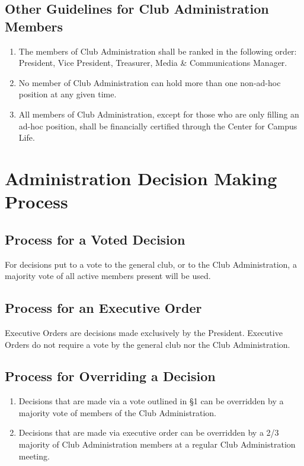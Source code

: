 \documentclass[english,11pt]{article}
\begin{document}
\subsection{Other Guidelines for Club Administration Members}

\begin{enumerate}[label=\Alph*.]
\item The members of Club Administration shall be ranked in the following order: President, Vice President, Treasurer, Media \& Communications Manager.
\item No member of Club Administration can hold more than one non-ad-hoc position at any given time.
\item All members of Club Administration, except for those who are only filling an ad-hoc position, shall be financially certified through the Center for Campus Life.
\end{enumerate}

\section{Administration Decision Making Process}

\subsection{Process for a Voted Decision}
For decisions put to a vote to the general club, or to the Club Administration, a majority vote of all active members present will be used.

\subsection{Process for an Executive Order}
Executive Orders are decisions made exclusively by the President.
Executive Orders do not require a vote by the general club nor the Club Administration.

\subsection{Process for Overriding a Decision}
\begin{enumerate}[label=\Alph*.]
\item Decisions that are made via a vote outlined in §1 can be overridden by a majority vote of members of the Club Administration.
\item Decisions that are made via executive order can be overridden by a 2/3 majority of Club Administration members at a regular Club Administration meeting.
\end{enumerate}
\end{document}
